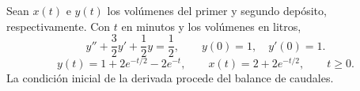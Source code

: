 Sean \(x(t)\) e \(y(t)\) los volúmenes del primer y segundo depósito, respectivamente. Con \(t\) en minutos y los volúmenes en litros,
\[
y''+\frac32y'+\frac12y=\frac12,\qquad y(0)=1,\quad y'(0)=1.
\]
\[
y(t)=1+2e^{-t/2}-2e^{-t},\qquad x(t)=2+2e^{-t/2},\qquad t\ge0.
\]
La condición inicial de la derivada procede del balance de caudales.
